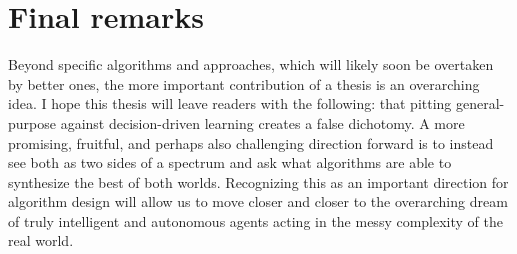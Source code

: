 \section{Final remarks}


Beyond specific algorithms and approaches, which will likely soon be overtaken by better ones, the more important contribution of a thesis is an overarching idea.
I hope this thesis will leave readers with the following: that pitting general-purpose against decision-driven learning creates a false dichotomy.
A more promising, fruitful, and perhaps also challenging direction forward is to instead see both as two sides of a spectrum and ask what algorithms are able to synthesize the best of both worlds.
Recognizing this as an important direction for algorithm design will allow us to move closer and closer to the overarching dream of truly intelligent and autonomous agents acting in the messy complexity of the real world.
